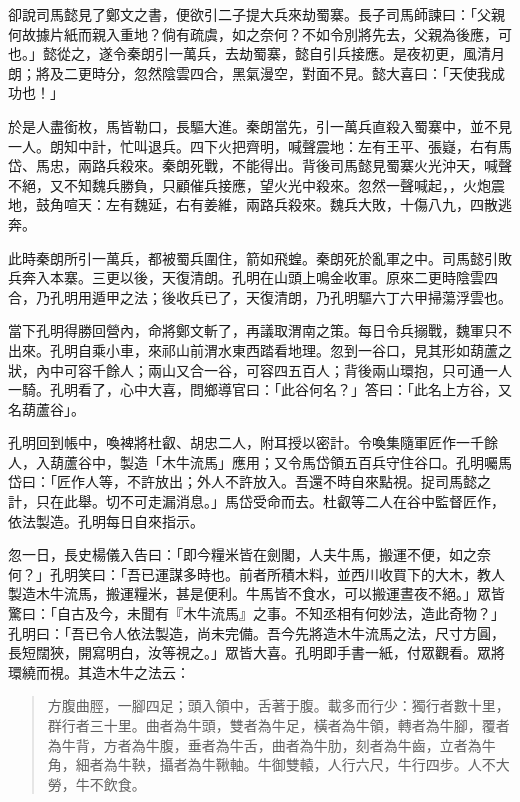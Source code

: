 卻說司馬懿見了鄭文之書，便欲引二子提大兵來劫蜀寨。長子司馬師諫曰：「父親何故據片紙而親入重地？倘有疏虞，如之奈何？不如令別將先去，父親為後應，可也。」懿從之，遂令秦朗引一萬兵，去劫蜀寨，懿自引兵接應。是夜初更，風清月朗；將及二更時分，忽然陰雲四合，黑氣漫空，對面不見。懿大喜曰：「天使我成功也！」

於是人盡銜枚，馬皆勒口，長驅大進。秦朗當先，引一萬兵直殺入蜀寨中，並不見一人。朗知中計，忙叫退兵。四下火把齊明，喊聲震地：左有王平、張嶷，右有馬岱、馬忠，兩路兵殺來。秦朗死戰，不能得出。背後司馬懿見蜀寨火光沖天，喊聲不絕，又不知魏兵勝負，只顧催兵接應，望火光中殺來。忽然一聲喊起，，火炮震地，鼓角喧天：左有魏延，右有姜維，兩路兵殺來。魏兵大敗，十傷八九，四散逃奔。

此時秦朗所引一萬兵，都被蜀兵圍住，箭如飛蝗。秦朗死於亂軍之中。司馬懿引敗兵奔入本寨。三更以後，天復清朗。孔明在山頭上鳴金收軍。原來二更時陰雲四合，乃孔明用遁甲之法；後收兵已了，天復清朗，乃孔明驅六丁六甲掃蕩浮雲也。

當下孔明得勝回營內，命將鄭文斬了，再議取渭南之策。每日令兵搦戰，魏軍只不出來。孔明自乘小車，來祁山前渭水東西踏看地理。忽到一谷口，見其形如葫蘆之狀，內中可容千餘人；兩山又合一谷，可容四五百人；背後兩山環抱，只可通一人一騎。孔明看了，心中大喜，問鄉導官曰：「此谷何名？」答曰：「此名上方谷，又名葫蘆谷」。

孔明回到帳中，喚裨將杜叡、胡忠二人，附耳授以密計。令喚集隨軍匠作一千餘人，入葫蘆谷中，製造「木牛流馬」應用；又令馬岱領五百兵守住谷口。孔明囑馬岱曰：「匠作人等，不許放出；外人不許放入。吾還不時自來點視。捉司馬懿之計，只在此舉。切不可走漏消息。」馬岱受命而去。杜叡等二人在谷中監督匠作，依法製造。孔明每日自來指示。

忽一日，長史楊儀入告曰：「即今糧米皆在劍閣，人夫牛馬，搬運不便，如之奈何？」孔明笑曰：「吾已運謀多時也。前者所積木料，並西川收買下的大木，教人製造木牛流馬，搬運糧米，甚是便利。牛馬皆不食水，可以搬運晝夜不絕。」眾皆驚曰：「自古及今，未聞有『木牛流馬』之事。不知丞相有何妙法，造此奇物？」孔明曰：「吾已令人依法製造，尚未完備。吾今先將造木牛流馬之法，尺寸方圓，長短闊狹，開寫明白，汝等視之。」眾皆大喜。孔明即手書一紙，付眾觀看。眾將環繞而視。其造木牛之法云：

\begin{quote}
方腹曲脛，一腳四足；頭入領中，舌著于腹。載多而行少：獨行者數十里，群行者三十里。曲者為牛頭，雙者為牛足，橫者為牛領，轉者為牛腳，覆者為牛背，方者為牛腹，垂者為牛舌，曲者為牛肋，刻者為牛齒，立者為牛角，細者為牛鞅，攝者為牛鞦軸。牛御雙轅，人行六尺，牛行四步。人不大勞，牛不飲食。
\end{quote}

